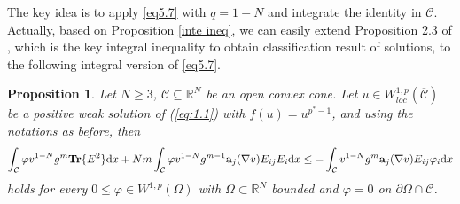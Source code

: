 \documentclass[12pt]{amsart}
\newtheorem{prop}[thm]{Proposition}
\theoremstyle{definition}
\theoremstyle{remark}
\theoremstyle{conclusion}
\theoremstyle{conjecture}
\numberwithin{equation}{section}
\begin{document}
The key idea is to apply \eqref{eq5.7} with $q=1-N$ and integrate the identity in $\mathcal{C}$. Actually, based on Proposition \ref{inte ineq}, we can easily extend Proposition 2.3 of \cite{Ou}, which is the key integral inequality to obtain classification result of solutions, to the following integral version of \eqref{eq5.7}.

\begin{prop}\label{pro2.4}
Let $N\geq3$, $\mathcal{C}\subseteq\mathbb{R}^{N}$ be an open convex cone. Let $u\in W^{1,p}_{loc}(\overline{\mathcal{C}})$ be a positive weak solution of (\ref{eq:1.1}) with $f(u)=u^{p^*-1}$, and using the notations as before, then
\begin{equation}\label{eq5.8}
\int_{\mathcal{C}}\varphi v^{1-N}g^m \mathbf{Tr}\{E^2\}\mathrm{d}x+Nm\int_{\mathcal{C}}\varphi v^{1-N}g^{m-1}{\bf{a}}_j(\nabla v)E_{ij}E_i\mathrm{d}x\leq -\int_{\mathcal{C}} v^{1-N}g^{m}{\bf{a}}_j(\nabla v)E_{ij}\varphi_i \mathrm{d}x
\end{equation}
holds for every $0\leq \varphi\in W^{1,p}(\Omega)$ with $\Omega\subset\mathbb{R}^N$ bounded and $\varphi=0$ on $\partial\Omega\cap\mathcal{C}$.
\end{prop}
\end{document}

